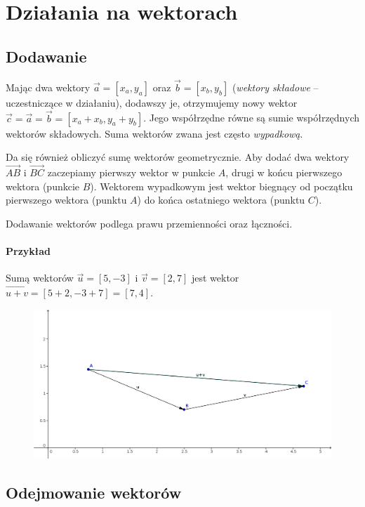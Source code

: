\documentclass [a4paper, 12pt, oneside]{article}
\newcommand{\vect}[1]{\overrightarrow{#1}}
\begin{document}
\section*{Działania na wektorach}

\subsection*{Dodawanie}

Mając dwa wektory $\vect{a} = [x_a, y_a]$ oraz $\vect{b} = [x_b, y_b]$ (\emph{wektory składowe} -- uczestniczące w działaniu), dodawszy je, otrzymujemy nowy wektor $\vect{c} = \vect{a} = \vect{b} = [x_a + x_b, y_a + y_b]$. Jego współrzędne równe są sumie współrzędnych wektorów składowych. Suma wektorów zwana jest często \emph{wypadkową}.

Da się również obliczyć sumę wektorów geometrycznie. Aby dodać dwa wektory $\vect{AB}$ i $\vect{BC}$ zaczepiamy pierwszy wektor w punkcie $A$, drugi w końcu pierwszego wektora (punkcie $B$). Wektorem wypadkowym jest wektor biegnący od początku pierwszego wektora (punktu $A$) do końca ostatniego wektora (punktu $C$).

Dodawanie wektorów podlega prawu przemienności oraz łączności.

\paragraph{Przykład} Sumą wektorów $\vect{u} = [5,-3]$ i $\vect{v} = [2,7]$ jest wektor $\vect{u+v} = [5+2, -3+7] = [7,4]$.

\begin{figure}[h]
\begin{center}
    \includegraphics[width=15cm]{Graphics/wektor2}
\end{center}
\end{figure}

\subsection*{Odejmowanie wektorów}
\end{document}
